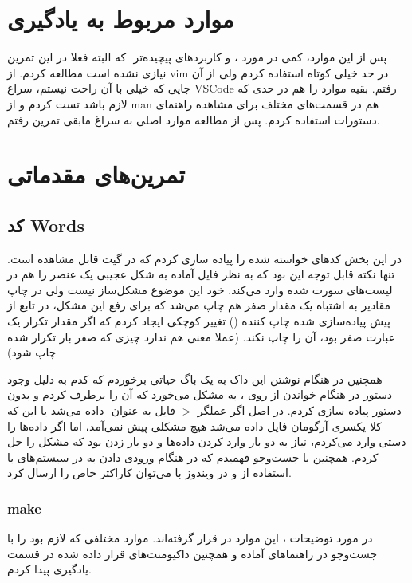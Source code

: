 \documentclass[12pt]{article}
\begin{document}
\section{موارد مربوط به یادگیری}

پس از این موارد، کمی در مورد ،  و کاربردهای پیچیده‌تر ‌ که البته فعلا در این تمرین نیازی نشده است مطالعه کردم. از vim در حد خیلی کوتاه استفاده کردم ولی از آن جایی که خیلی با آن راحت نیستم، سراغ VSCode رفتم. بقیه موارد را هم در حدی که لازم باشد تست کردم و از man هم در قسمت‌های مختلف برای مشاهده راهنمای دستورات استفاده کردم. پس از مطالعه موارد اصلی به سراغ مابقی تمرین رفتم.


\section{تمرین‌های مقدماتی}
\subsection{کد Words}

در این بخش کد‌های خواسته شده را پیاده سازی کردم که در گیت قابل مشاهده است. تنها نکته قابل توجه این بود که به نظر فایل آماده  به شکل عجیبی یک عنصر  را هم در لیست‌های سورت شده وارد می‌کند. خود این موضوع مشکل‌ساز نیست ولی در چاپ مقادیر  به اشتباه یک مقدار صفر  هم چاپ می‌شد که برای رفع این مشکل، در تابع از پیش پیاده‌سازی شده چاپ کننده () تغییر کوچکی ایجاد کردم که اگر مقدار تکرار یک عبارت صفر بود، آن را چاپ نکند. (عملا معنی هم ندارد چیزی که صفر بار تکرار شده چاپ شود)

همچنین در هنگام نوشتن این داک به یک باگ حیاتی برخوردم که کدم به دلیل وجود دستور  در هنگام خواندن از روی ، به مشکل می‌خورد که آن را برطرف کردم و بدون دستور  پیاده سازی کردم. در اصل اگر عملگر $>$ فایل به عنوان ‌ داده می‌شد یا این که کلا یکسری آرگومان فایل داده می‌شد هیچ مشکلی پیش نمی‌آمد، اما اگر داده‌ها را دستی وارد می‌کردم، نیاز به دو بار وارد کردن داده‌ها و دو بار  زدن بود که مشکل را حل کردم. همچنین با جست‌وجو فهمیدم که در هنگام ورودی دادن به  در سیستم‌های  با استفاده از  و در ویندوز با  می‌توان کاراکتر خاص  را ارسال کرد.

\subsubsection{make}

در مورد توضیحات ، این موارد در  قرار گرفته‌اند. موارد مختلفی که لازم بود را با جست‌وجو در راهنماهای آماده و همچنین داکیومنت‌های قرار داده شده در قسمت یادگیری پیدا کردم.
\end{document}
